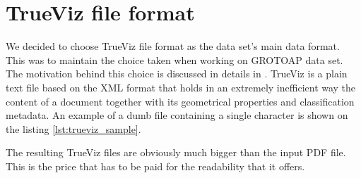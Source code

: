 \section{TrueViz file format} \label{sec:trueviz_file_format}
We decided to choose TrueViz file format as the data set's main data format. This was to maintain the choice taken when working on GROTOAP data set. The motivation behind this choice is discussed in details in \cite{Tkaczyk2012}. TrueViz is a plain text file based on the XML format that holds in an extremely inefficient way the content of a document together with its geometrical properties and classification metadata. An example of a dumb file containing a single character is shown on the listing \ref{lst:trueviz_sample}.

The resulting TrueViz files are obviously much bigger than the input PDF file. This is the price that has to be paid for the readability that it offers.

